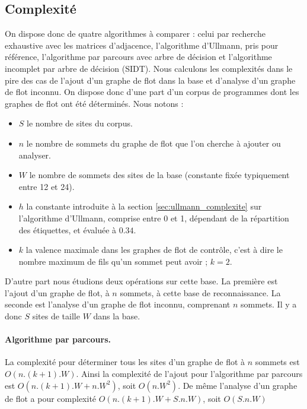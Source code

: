 \subsection{Complexité}
On dispose donc de quatre algorithmes à comparer : celui par recherche exhaustive avec les matrices d'adjacence, l'algorithme d'Ullmann, pris pour référence, l'algorithme par parcours avec arbre de décision et l'algorithme incomplet par arbre de décision (SIDT).
Nous calculons les complexités dans le pire des cas de l'ajout d'un graphe de flot dans la base et d'analyse d'un graphe de flot inconnu.
On dispose donc d'une part d'un corpus de programmes dont les graphes de flot ont été déterminés.
Nous notons :
\begin{itemize}
 \item $S$ le nombre de sites du corpus.
 \item $n$ le nombre de sommets du graphe de flot que l'on cherche à ajouter ou analyser.
 \item $W$ le nombre de sommets des sites de la base (constante fixée typiquement entre 12 et 24).
 \item $h$ la constante introduite à la section \ref{sec:ullmann_complexite} sur l'algorithme d'Ullmann, comprise entre 0 et 1, dépendant de la répartition des étiquettes, et évaluée à $0.34$.
 \item $k$ la valence maximale dans les graphes de flot de contrôle, c'est à dire le nombre maximum de fils qu'un sommet peut avoir ; $k=2$.
\end{itemize}
D'autre part nous étudions deux opérations sur cette base.
La première est l'ajout d'un graphe de flot, à $n$ sommets, à cette base de reconnaissance.
La seconde est l'analyse d'un graphe de flot inconnu, comprenant $n$ sommets.
Il y a donc $S$ sites de taille $W$ dans la base.

\paragraph{Algorithme par parcours.}
La complexité pour déterminer tous les sites d'un graphe de flot à $n$ sommets est $O(n.(k+1).W)$.
Ainsi la complexité de l'ajout pour l'algorithme par parcours est $O(n.(k+1).W+n.W^2)$, soit $O(n.W^2)$.
De même l'analyse d'un graphe de flot a pour complexité $O(n.(k+1).W+S.n.W)$, soit $O(S.n.W)$

